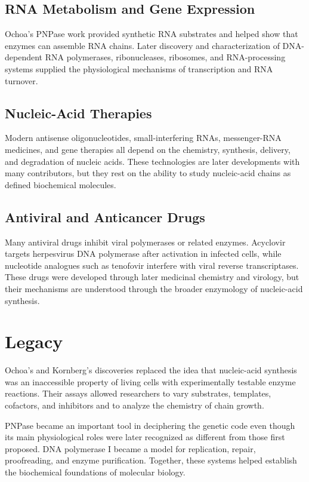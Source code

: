 \subsection{RNA Metabolism and Gene Expression}

Ochoa's PNPase work provided synthetic RNA substrates and helped show that enzymes can assemble RNA chains. Later discovery and characterization of DNA-dependent RNA polymerases, ribonucleases, ribosomes, and RNA-processing systems supplied the physiological mechanisms of transcription and RNA turnover.

\subsection{Nucleic-Acid Therapies}

Modern antisense oligonucleotides, small-interfering RNAs, messenger-RNA medicines, and gene therapies all depend on the chemistry, synthesis, delivery, and degradation of nucleic acids. These technologies are later developments with many contributors, but they rest on the ability to study nucleic-acid chains as defined biochemical molecules.

\subsection{Antiviral and Anticancer Drugs}

Many antiviral drugs inhibit viral polymerases or related enzymes. Acyclovir targets herpesvirus DNA polymerase after activation in infected cells, while nucleotide analogues such as tenofovir interfere with viral reverse transcriptases. These drugs were developed through later medicinal chemistry and virology, but their mechanisms are understood through the broader enzymology of nucleic-acid synthesis.

\section{Legacy}

Ochoa's and Kornberg's discoveries replaced the idea that nucleic-acid synthesis was an inaccessible property of living cells with experimentally testable enzyme reactions. Their assays allowed researchers to vary substrates, templates, cofactors, and inhibitors and to analyze the chemistry of chain growth.

PNPase became an important tool in deciphering the genetic code even though its main physiological roles were later recognized as different from those first proposed. DNA polymerase I became a model for replication, repair, proofreading, and enzyme purification. Together, these systems helped establish the biochemical foundations of molecular biology.

